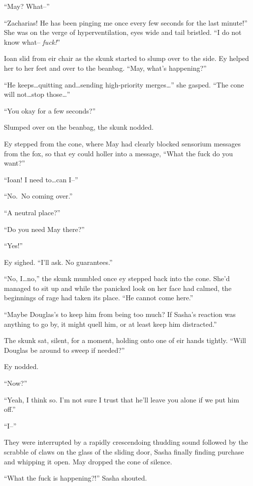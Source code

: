 ``May? What--''

``Zacharias! He has been pinging me once every few seconds for the last minute!'' She was on the verge of hyperventilation, eyes wide and tail bristled. ``I do not know what-- \emph{fuck!}''

Ioan slid from eir chair as the skunk started to slump over to the side. Ey helped her to her feet and over to the beanbag. ``May, what's happening?''

``He keeps\ldots quitting and\ldots sending high-priority merges\ldots{}'' she gasped. ``The cone will not\ldots stop those\ldots{}''

``You okay for a few seconds?''

Slumped over on the beanbag, the skunk nodded.

Ey stepped from the cone, where May had clearly blocked sensorium messages from the fox, so that ey could holler into a message, ``What the fuck do you want?''

``Ioan! I need to\ldots can I--''

``No.~No coming over.''

``A neutral place?''

``Do you need May there?''

``Yes!''

Ey sighed. ``I'll ask. No guarantees.''

``No, I\ldots no,'' the skunk mumbled once ey stepped back into the cone. She'd managed to sit up and while the panicked look on her face had calmed, the beginnings of rage had taken its place. ``He cannot come here.''

``Maybe Douglas's to keep him from being too much? If Sasha's reaction was anything to go by, it might quell him, or at least keep him distracted.''

The skunk sat, silent, for a moment, holding onto one of eir hands tightly. ``Will Douglas be around to sweep if needed?''

Ey nodded.

``Now?''

``Yeah, I think so. I'm not sure I trust that he'll leave you alone if we put him off.''

``I--''

They were interrupted by a rapidly crescendoing thudding sound followed by the scrabble of claws on the glass of the sliding door, Sasha finally finding purchase and whipping it open. May dropped the cone of silence.

``What the fuck is happening?!'' Sasha shouted.

